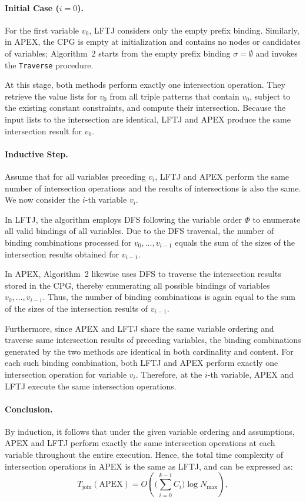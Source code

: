 \documentclass[11pt]{article}
\begin{document}
\paragraph{Initial Case ($i = 0$).}
For the first variable $v_0$, LFTJ considers only the empty prefix binding. Similarly, in APEX, the CPG is empty at initialization and contains no nodes or candidates of variables; Algorithm~2 starts from the empty prefix binding $\sigma = \emptyset$ and invokes the \texttt{Traverse} procedure.

At this stage, both methods perform exactly one intersection operation. They retrieve the value lists for $v_0$ from all triple patterns that contain $v_0$, subject to the existing constant constraints, and compute their intersection. Because the input lists to the intersection are identical, LFTJ and APEX produce the same intersection result for $v_0$.

\paragraph{Inductive Step.}
Assume that for all variables preceding $v_i$, LFTJ and APEX perform the same number of intersection operations and the results of intersections is also the same. We now consider the $i$-th variable $v_i$.

In LFTJ, the algorithm employs DFS following the variable order $\Phi$ to enumerate all valid bindings of all variables.
Due to the DFS traversal, the number of binding combinations processed for $v_0, \ldots, v_{i-1}$ equals the sum of the sizes of the intersection results obtained for $v_{i-1}$.

In APEX, Algorithm~2 likewise uses DFS to traverse the intersection results stored in the CPG, thereby enumerating all possible bindings of variables $v_0, \ldots, v_{i-1}$. Thus, the number of binding combinations is again equal to the sum of the sizes of the intersection results of $v_{i-1}$.

Furthermore, since APEX and LFTJ share the same variable ordering and traverse same intersection results of preceding variables, the binding combinations generated by the two methods are identical in both cardinality and content.
For each such binding combination, both LFTJ and APEX perform exactly one intersection operation for variable $v_i$. Therefore, at the $i$-th variable, APEX and LFTJ execute the same intersection operations.

\paragraph{Conclusion.}
By induction, it follows that under the given variable ordering and assumptions, APEX and LFTJ perform exactly the same intersection operations at each variable throughout the entire execution.
Hence, the total time complexity of intersection operations in APEX is the same as LFTJ, and can be expressed as:
$$
T_{\text{join}}(\text{APEX})
= O\!\left(\Big(\sum_{i=0}^{k-1} C_i\Big)\log N_{\max}\right),
$$
\end{document}
